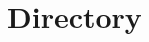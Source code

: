 \documentclass[
11pt, %
english, %
singlespacing, %
headsepline, %
]{MastersDoctoralThesis} %
\begin{document}

\chapter{Directory} %
\label{chapter:directory}

\listoffigures %

\listoftables %

\renewcommand\listoflistingscaption{List of source codes}
\listoflistings %



\printbibliography


\appendix %


%
%




\end{document}

